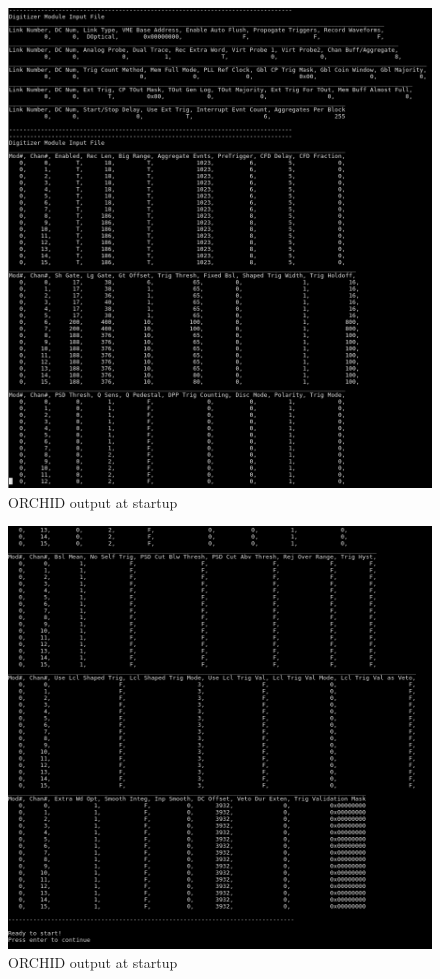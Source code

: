 \documentclass[onecolumn, 10pt, letterpaper, twoside]{article}
\begin{document}
\begin{figure}[h!]
\begin{center}
\includegraphics[width=\textwidth]{./Start_Screen_4.png}
\caption{ORCHID output at startup}
\label{fig:ORCHID_Startup4}
\end{center}
\end{figure}
\begin{figure}[h!]
\begin{center}
\includegraphics[width=\textwidth]{./Start_Screen_5.png}
\caption{ORCHID output at startup}
\label{fig:ORCHID_Startup5}
\end{center}
\end{figure}
\end{document}

